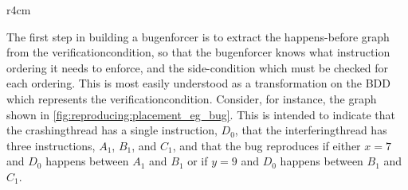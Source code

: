 \begin{wrapfigure}{r}{4cm}
  \vspace{-5mm}
  \vspace{-10mm}
  \caption{}
  \vspace{-5mm}
  \label{fig:reproducing:placement_eg_bug}
\end{wrapfigure}
The first step in building a \gls{bugenforcer} is to extract the
happens-before graph from the \gls{verificationcondition}, so that the
\gls{bugenforcer} knows what instruction ordering it needs to enforce,
and the side-condition which must be checked for each ordering.  This
is most easily understood as a transformation on the BDD which
represents the \gls{verificationcondition}.  Consider, for instance,
the graph shown in \autoref{fig:reproducing:placement_eg_bug}.  This
is intended to indicate that the \gls{crashingthread} has a single
instruction, $D_0$, that the \gls{interferingthread} has three
instructions, $A_1$, $B_1$, and $C_1$, and that the bug reproduces if
either $x = 7$ and $D_0$ happens between $A_1$ and $B_1$ or if $y = 9$
and $D_0$ happens between $B_1$ and $C_1$.


